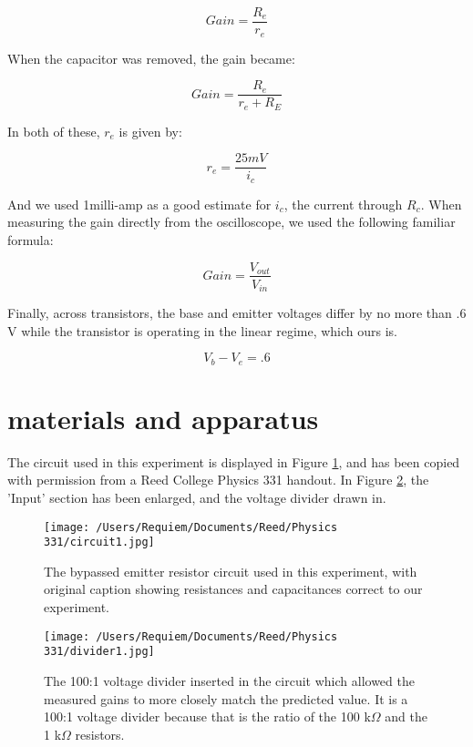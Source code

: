 \documentclass[aps,pre,twocolumn,nofootinbib]{revtex4}
\begin{document}
\begin{equation}
\label{gainwithcapacitor}
Gain=\frac{R_e}{r_e}
\end{equation}

When the capacitor was removed, the gain became:

\begin{equation}
\label{gainwithoutcapacitor}
Gain=\frac{R_e}{r_e+R_E}
\end{equation}

In both of these, $r_e$ is given by: 

\begin{equation}
\label{re}
r_e=\frac{25mV}{i_c}
\end{equation}

And we used 1milli-amp as a good estimate for $i_c$, the current through $R_c$.  When measuring the gain directly from the oscilloscope, we used the following familiar formula: \cite{powell}

\begin{equation}
\label{measuredgain}
Gain=\frac{V_{out}}{V_{in}} 
\end{equation}

Finally, across transistors, the base and emitter voltages differ by no more than .6 V while the transistor is operating in the linear regime, which ours is.  

\begin{equation}
\label{transistor}
V_b-V_e = .6
\end{equation}

\section{materials and apparatus}

The circuit used in this experiment is displayed in Figure \ref{circuit}, and has been copied with permission from a Reed College Physics 331 handout.  In Figure \ref{divider}, the 'Input' section has been enlarged, and the voltage divider drawn in.  

\begin{figure}[h]
\centering
\texttt{[image: /Users/Requiem/Documents/Reed/Physics 331/circuit1.jpg]} 
\caption{The bypassed emitter resistor circuit used in this experiment, with original caption showing resistances and capacitances correct to our experiment.}
\label{circuit}
\end{figure}

\begin{figure}[h]
\centering
\texttt{[image: /Users/Requiem/Documents/Reed/Physics 331/divider1.jpg]} 
\caption{The 100:1 voltage divider inserted in the circuit which allowed the measured gains to more closely match the predicted value. It is a 100:1 voltage divider because that is the ratio of the 100 k$\Omega$ and the 1 k$\Omega$ resistors.}
\label{divider}
\end{figure}
\end{document}
